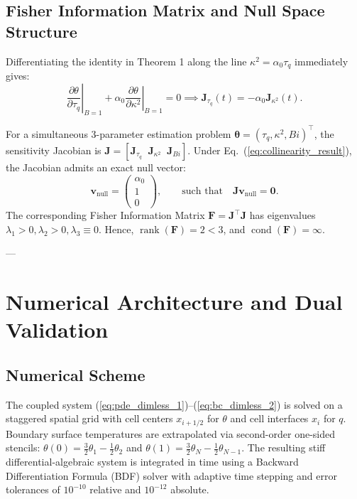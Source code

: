 \documentclass[review,12pt]{article}
\begin{document}
\subsection{Fisher Information Matrix and Null Space Structure}

Differentiating the identity in Theorem 1 along the line $\kappa^2 = \alpha_0 \tau_q$ immediately gives:
\begin{equation}
\left.\frac{\partial \theta}{\partial \tau_q}\right|_{B=1} + \alpha_0 \left.\frac{\partial \theta}{\partial \kappa^2}\right|_{B=1} = 0 \implies \bm{J}_{\tau_q}(t) = -\alpha_0 \bm{J}_{\kappa^2}(t).
\label{eq:collinearity_result}
\end{equation}

For a simultaneous 3-parameter estimation problem $\bm{\theta} = (\tau_q, \kappa^2, Bi)^\top$, the sensitivity Jacobian is $\bm{J} = [\bm{J}_{\tau_q} \;\; \bm{J}_{\kappa^2} \;\; \bm{J}_{Bi}]$. Under Eq.~(\ref{eq:collinearity_result}), the Jacobian admits an exact null vector:
\begin{equation}
\bm{v}_{\mathrm{null}} = \begin{pmatrix} \alpha_0 \\ 1 \\ 0 \end{pmatrix}, \qquad \text{such that} \quad \bm{J} \bm{v}_{\mathrm{null}} = \bm{0}.
\label{eq:null_vector}
\end{equation}
The corresponding Fisher Information Matrix $\bm{F} = \bm{J}^\top \bm{J}$ has eigenvalues $\lambda_1 > 0, \lambda_2 > 0, \lambda_3 \equiv 0$. Hence, $\operatorname{rank}(\bm{F}) = 2 < 3$, and $\operatorname{cond}(\bm{F}) = \infty$.

---

\section{Numerical Architecture and Dual Validation}

\subsection{Numerical Scheme}

The coupled system (\ref{eq:pde_dimless_1})--(\ref{eq:bc_dimless_2}) is solved on a staggered spatial grid with cell centers $x_{i+1/2}$ for $\theta$ and cell interfaces $x_i$ for $q$. Boundary surface temperatures are extrapolated via second-order one-sided stencils: $\theta(0) = \frac{3}{2}\theta_1 - \frac{1}{2}\theta_2$ and $\theta(1) = \frac{3}{2}\theta_N - \frac{1}{2}\theta_{N-1}$. The resulting stiff differential-algebraic system is integrated in time using a Backward Differentiation Formula (BDF) solver with adaptive time stepping and error tolerances of $10^{-10}$ relative and $10^{-12}$ absolute.
\end{document}
